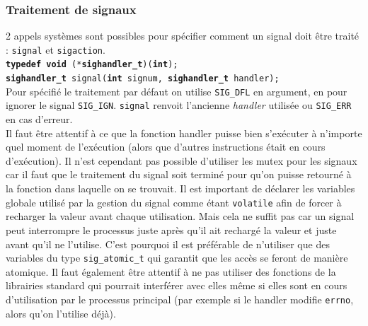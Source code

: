 \subsubsection{Traitement de signaux}
2 appels systèmes sont possibles pour spécifier comment un signal doit être traité : \texttt{signal} et \texttt{sigaction}. \\
\texttt{\textbf{typedef} \textbf{void} (*\textbf{sighandler\_t})(\textbf{int});\\
\textbf{sighandler\_t} signal(\textbf{int} signum, \textbf{sighandler\_t} handler);}\\
Pour spécifié le traitement par défaut on utilise \texttt{SIG\_DFL} en argument, en pour ignorer le signal \texttt{SIG\_IGN}. \texttt{signal} renvoit l'ancienne \textit{handler} utilisée ou \texttt{SIG\_ERR} en cas d'erreur.\\

Il faut être attentif à ce que la fonction handler puisse bien s'exécuter à n'importe quel moment de l'exécution (alors que d'autres instructions était en cours d'exécution). Il n'est cependant pas possible d'utiliser les mutex pour les signaux car il faut que le traitement du signal soit terminé pour qu'on puisse retourné à la fonction dans laquelle on se trouvait. Il est important de déclarer les variables globale utilisé par la gestion du signal comme étant \texttt{volatile} afin de forcer à recharger la valeur avant chaque utilisation. Mais cela ne suffit pas car un signal peut interrompre le processus juste après qu'il ait rechargé la valeur et juste avant qu'il ne l'utilise. C'est pourquoi il est préférable de n'utiliser que des variables du type \texttt{sig\_atomic\_t} qui garantit que les accès se feront de manière atomique. Il faut également être attentif à ne pas utiliser des fonctions de la librairies standard qui pourrait interférer avec elles même si elles sont en cours d'utilisation par le processus principal (par exemple si le handler modifie \texttt{errno}, alors qu'on l'utilise déjà). \\

